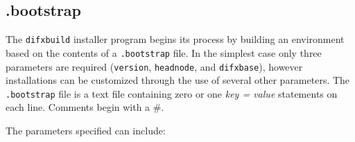 
\subsection{.bootstrap} \label{sec:bootstrapfile}

The {\tt difxbuild} installer program begins its process by building an environment based on the contents of a {\tt .bootstrap} file.
In the simplest case only three parameters are required ({\tt version}, {\tt headnode}, and {\tt difxbase}), however installations can be customized through the use of several other parameters.
The {\tt .bootstrap} file is a text file containing zero or one {\em key = value} statements on each line.
Comments begin with a \#.

The parameters specified can include:

